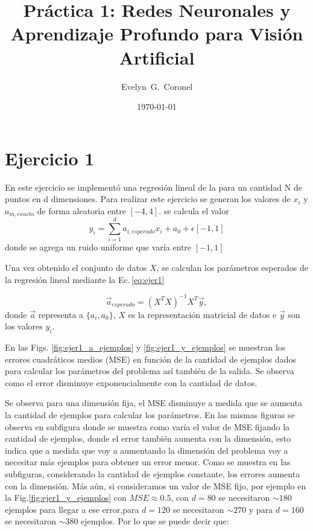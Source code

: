 


\title{Práctica 1: Redes Neuronales y Aprendizaje Profundo para Visión Artificial}
\author{Evelyn~G.~Coronel}


\date[]{\lowercase{\today}} %

\maketitle


\section*{Ejercicio 1}

En este ejercicio se implementó una regresión lineal de la  para un cantidad N de puntos en d dimensiones.  Para realizar este ejercicio se generan los valores de $x_i$ y $a_{m,exacto}$ de forma aleatoria entre $[-4,4]$. se calcula el valor
\begin{equation}
  y_i= \sum_{i=1}^d a_{i,esperado}x_i+ a_0 + \epsilon[-1,1]  
\end{equation}
donde se agrega un ruido uniforme que varía entre $[-1,1]$

Una vez obtenido el conjunto de datos $X$, se calculan  los parámetros esperados de la regresión lineal mediante la Ec.\,\ref{eq:ejer1}

\begin{equation}
     \vec a_{esperado} = (X^TX)^{-1}X^T \vec y,
     \label{eq:ejer1}
 \end{equation} 
donde $\vec a$ representa a $\{a_i, a_0 \}$, $X$ es la representación matricial de datos e $\vec y$ son los valores $y_i$.

En las Figs.  \ref{fig:ejer1_a_ejemplos} y \ref{fig:ejer1_y_ejemplos}  se muestran los errores cuadráticos medios  (MSE) en función de la cantidad de ejemplos dados para calcular los parámetros del problema así también de la salida.  Se observa como el error disminuye exponencialmente con la cantidad de datos.

Se observa  para una dimensión fija, el MSE disminuye a medida que se aumenta la cantidad de ejemplos para calcular los parámetros. En las mismas figuras se observa en subfigura donde se muestra como varía el valor de MSE fijando la cantidad de ejemplos, donde el error también aumenta con la dimensión, esto indica que a medida que voy a aumentando la dimensión del problema voy a necesitar más ejemplos para obtener un error menor. 
Como se muestra en las subfiguras, considerando la cantidad de ejemplos constante, los errores  aumenta con la dimensión. Más aún, si consideramos un valor de MSE fijo, por ejemplo en la Fig.\ref{fig:ejer1_y_ejemplos} con $MSE\approx 0.5$, con $d=80$ se necesitaron $\sim 180$ ejemplos para llegar a ese error,para  $d=120$ se necesitaron $\sim 270$ y para $d=160$ se necesitaron $\sim 380$  ejemplos. Por lo que se puede decir que:

